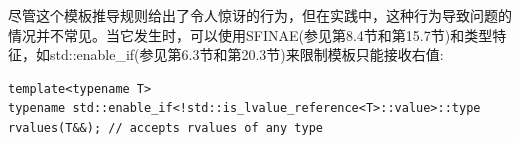 尽管这个模板推导规则给出了令人惊讶的行为，但在实践中，这种行为导致问题的情况并不常见。当它发生时，可以使用SFINAE(参见第8.4节和第15.7节)和类型特征，如std::enable\_if(参见第6.3节和第20.3节)来限制模板只能接收右值:

\begin{lstlisting}[style=styleCXX]
template<typename T>
typename std::enable_if<!std::is_lvalue_reference<T>::value>::type
rvalues(T&&); // accepts rvalues of any type
\end{lstlisting}



























